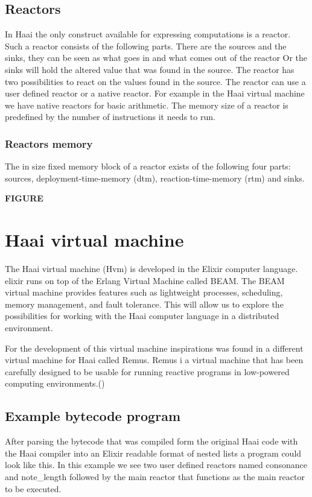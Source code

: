 \documentclass[a4paper]{book}
\begin{document}
\section{Reactors}
In Haai the only construct available for expressing computations is a reactor. Such a reactor consists of the following parts. There are the sources and the sinks, they can be seen as what goes in and what comes out of the reactor Or the sinks will hold the altered value that was found in the source. The reactor has two possibilities to react on the values found in the source. The reactor can use a user defined reactor or a native reactor. For example in the Haai virtual machine we have native reactors for basic arithmetic. The memory size of a reactor is predefined by the number of instructions it needs to run. 
\subsection{Reactors memory}
The in size fixed memory block of a reactor exists of the following four parts: sources, deployment-time-memory (dtm), reaction-time-memory (rtm) and sinks.  

\textbf{FIGURE} 



\chapter{Haai virtual machine}
The Haai virtual machine (Hvm) is developed in the Elixir computer language. elixir runs on top of the Erlang Virtual Machine called BEAM. The BEAM virtual machine provides features such as lightweight processes, scheduling, memory management, and fault tolerance. This will allow us to explore the possibilities for working with the Haai computer language in a distributed environment.

For the development of this virtual machine inspirations was found in a different virtual machine for Haai called Remus. Remus i a virtual machine that has been carefully designed to be usable for running reactive programs in low-powered computing environments.(\cite{oeyen_remus_2022}) 

\section{Example bytecode program}

After parsing the bytecode that was compiled form the original Haai code with the Haai compiler into an Elixir readable format of nested lists a program could look like this. In this example we see two user defined reactors named consonance and note\_length followed by the main reactor that functions as the main reactor to be executed. 
\end{document}
